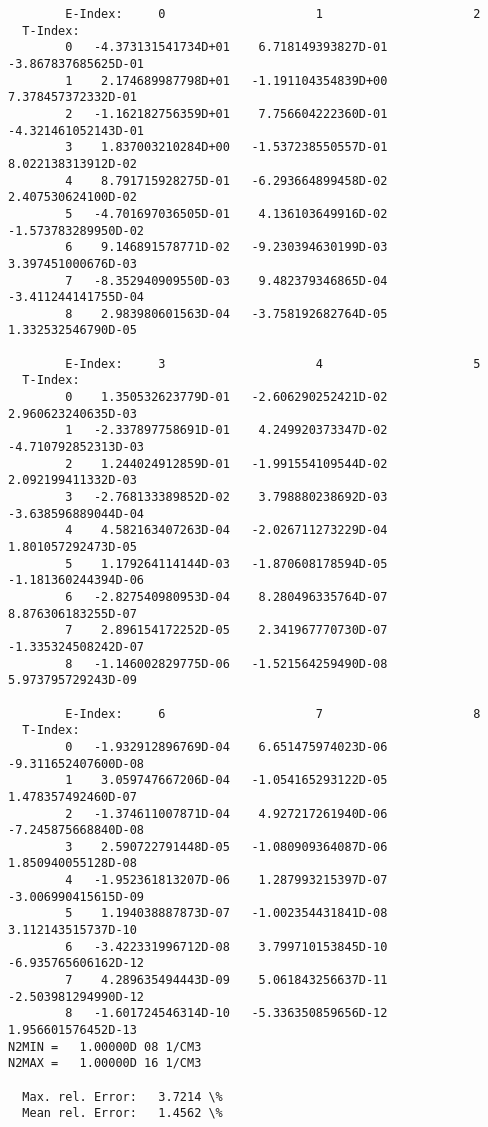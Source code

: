 \documentclass[12pt,dvipdfmx]{article}
\begin{document}
{\begin{small}\begin{verbatim}
        E-Index:     0                     1                     2
  T-Index:
        0   -4.373131541734D+01    6.718149393827D-01   -3.867837685625D-01
        1    2.174689987798D+01   -1.191104354839D+00    7.378457372332D-01
        2   -1.162182756359D+01    7.756604222360D-01   -4.321461052143D-01
        3    1.837003210284D+00   -1.537238550557D-01    8.022138313912D-02
        4    8.791715928275D-01   -6.293664899458D-02    2.407530624100D-02
        5   -4.701697036505D-01    4.136103649916D-02   -1.573783289950D-02
        6    9.146891578771D-02   -9.230394630199D-03    3.397451000676D-03
        7   -8.352940909550D-03    9.482379346865D-04   -3.411244141755D-04
        8    2.983980601563D-04   -3.758192682764D-05    1.332532546790D-05

        E-Index:     3                     4                     5
  T-Index:
        0    1.350532623779D-01   -2.606290252421D-02    2.960623240635D-03
        1   -2.337897758691D-01    4.249920373347D-02   -4.710792852313D-03
        2    1.244024912859D-01   -1.991554109544D-02    2.092199411332D-03
        3   -2.768133389852D-02    3.798880238692D-03   -3.638596889044D-04
        4    4.582163407263D-04   -2.026711273229D-04    1.801057292473D-05
        5    1.179264114144D-03   -1.870608178594D-05   -1.181360244394D-06
        6   -2.827540980953D-04    8.280496335764D-07    8.876306183255D-07
        7    2.896154172252D-05    2.341967770730D-07   -1.335324508242D-07
        8   -1.146002829775D-06   -1.521564259490D-08    5.973795729243D-09

        E-Index:     6                     7                     8
  T-Index:
        0   -1.932912896769D-04    6.651475974023D-06   -9.311652407600D-08
        1    3.059747667206D-04   -1.054165293122D-05    1.478357492460D-07
        2   -1.374611007871D-04    4.927217261940D-06   -7.245875668840D-08
        3    2.590722791448D-05   -1.080909364087D-06    1.850940055128D-08
        4   -1.952361813207D-06    1.287993215397D-07   -3.006990415615D-09
        5    1.194038887873D-07   -1.002354431841D-08    3.112143515737D-10
        6   -3.422331996712D-08    3.799710153845D-10   -6.935765606162D-12
        7    4.289635494443D-09    5.061843256637D-11   -2.503981294990D-12
        8   -1.601724546314D-10   -5.336350859656D-12    1.956601576452D-13
N2MIN =   1.00000D 08 1/CM3
N2MAX =   1.00000D 16 1/CM3

  Max. rel. Error:   3.7214 \%
  Mean rel. Error:   1.4562 \%



\end{verbatim}
\end{small}}
\end{document}
